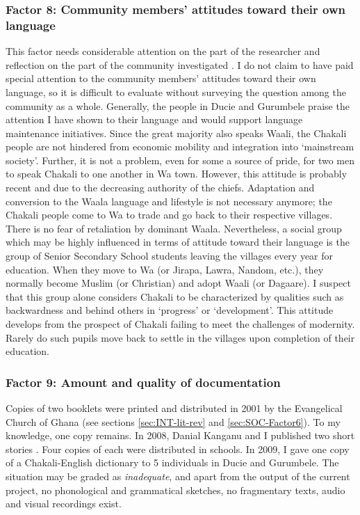 \subsubsection{Factor 8:  Community members' attitudes toward their own
language}
\label{sec:SOC-Factor8}

This factor needs considerable attention on the part of the researcher and
reflection on the part of the community investigated \citep[27]{Lewi05}.  I do
not claim to have paid special attention to the community members' attitudes
toward their own language, so it is difficult to evaluate without surveying the
question among the community as a whole. Generally, the people in Ducie and
Gurumbele  praise the attention I have shown to their language and would support
language maintenance initiatives.  Since the great majority also speaks Waali,
the Chakali people are not hindered from economic mobility and integration  into
`mainstream society'. Further, it is not a problem, even for some a source of
pride, for two men to speak Chakali to one another in Wa town.  However, this
attitude is probably recent and due to the decreasing authority of the chiefs.
Adaptation and conversion to the Waala language and lifestyle is not necessary
anymore; the Chakali people come to Wa to trade and go back to their respective
villages. There is no fear of retaliation by dominant Waala. Nevertheless, a
social group which may be highly influenced in terms of attitude toward their
language is the group of Senior Secondary School students leaving the villages
every year for education. When they move to Wa (or Jirapa, Lawra, Nandom, etc.),
they normally become Muslim (or Christian) and  adopt  Waali (or Dagaare).  I
suspect that this group alone considers Chakali to be characterized by qualities
such as backwardness and behind others in `progress' or `development'. This
attitude develops from the prospect of Chakali failing to meet the challenges of
modernity. Rarely do such pupils move back to settle in the villages upon
completion of their  education.

\subsubsection{Factor 9: Amount and quality of documentation}
\label{sec:SOC-Facrto9}

Copies of two booklets were printed and distributed in 2001 by the  Evangelical
Church of Ghana (see sections \ref{sec:INT-lit-rev} and \ref{sec:SOC-Factor6}).
To
my  knowledge, one copy remains. In 2008,  Danial Kanganu and I published two
short stories \citep{Kang07a, Kang07b}. Four copies of each were distributed in
schools. In 2009, I gave one copy of a Chakali-English dictionary to 5
individuals in Ducie and Gurumbele.  The situation may be graded as {\it
inadequate},  and apart from the output of the current project, no phonological
and grammatical sketches, no fragmentary texts, audio and visual recordings 
exist.


